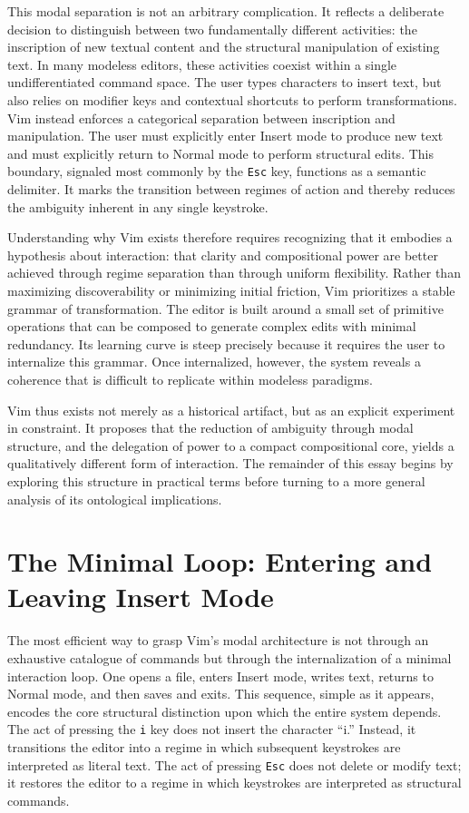 \documentclass[12pt]{article}
\begin{document}
This modal separation is not an arbitrary complication. It reflects a deliberate decision to distinguish between two fundamentally different activities: the inscription of new textual content and the structural manipulation of existing text. In many modeless editors, these activities coexist within a single undifferentiated command space. The user types characters to insert text, but also relies on modifier keys and contextual shortcuts to perform transformations. Vim instead enforces a categorical separation between inscription and manipulation. The user must explicitly enter Insert mode to produce new text and must explicitly return to Normal mode to perform structural edits. This boundary, signaled most commonly by the \texttt{Esc} key, functions as a semantic delimiter. It marks the transition between regimes of action and thereby reduces the ambiguity inherent in any single keystroke.

Understanding why Vim exists therefore requires recognizing that it embodies a hypothesis about interaction: that clarity and compositional power are better achieved through regime separation than through uniform flexibility. Rather than maximizing discoverability or minimizing initial friction, Vim prioritizes a stable grammar of transformation. The editor is built around a small set of primitive operations that can be composed to generate complex edits with minimal redundancy. Its learning curve is steep precisely because it requires the user to internalize this grammar. Once internalized, however, the system reveals a coherence that is difficult to replicate within modeless paradigms.

Vim thus exists not merely as a historical artifact, but as an explicit experiment in constraint. It proposes that the reduction of ambiguity through modal structure, and the delegation of power to a compact compositional core, yields a qualitatively different form of interaction. The remainder of this essay begins by exploring this structure in practical terms before turning to a more general analysis of its ontological implications.

\section{The Minimal Loop: Entering and Leaving Insert Mode}

The most efficient way to grasp Vim’s modal architecture is not through an exhaustive catalogue of commands but through the internalization of a minimal interaction loop. One opens a file, enters Insert mode, writes text, returns to Normal mode, and then saves and exits. This sequence, simple as it appears, encodes the core structural distinction upon which the entire system depends. The act of pressing the \texttt{i} key does not insert the character “i.” Instead, it transitions the editor into a regime in which subsequent keystrokes are interpreted as literal text. The act of pressing \texttt{Esc} does not delete or modify text; it restores the editor to a regime in which keystrokes are interpreted as structural commands.
\end{document}
